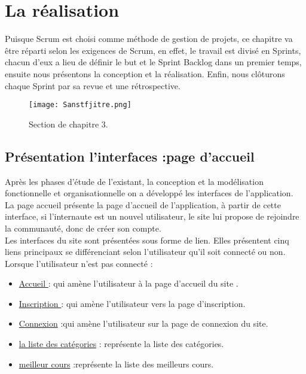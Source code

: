 \chapter{La réalisation }
\label{sec:conception}

\begin{fquote}Puisque Scrum est choisi comme méthode de gestion de projets, ce chapitre va être réparti selon
	les exigences de Scrum, en effet, le travail est divisé en Sprints, chacun d’eux a lieu de définir le but
	et le Sprint Backlog dans un premier temps, ensuite nous présentons la conception et la réalisation.
	Enfin, nous clôturons chaque Sprint par sa revue et une rétrospective.
 \end{fquote}
\begin{figure}[ht]
	\centering
	\texttt{[image: Sanstfjitre.png]}
	\caption{Section de chapitre 3.}
	\label{fig:Section de chapitre 3}
\end{figure}
\FloatBarrier
\clearpage
\section{Présentation l'interfaces :page d'accueil}
Après les phases d’étude de l’existant, la conception et la modélisation fonctionnelle et
organisationnelle on a développé les interfaces de l’application.\\
La page accueil présente la page d’accueil de l’application, à partir de cette interface, si
l’internaute est un nouvel utilisateur, le site lui propose de rejoindre la communauté, donc de
créer son compte.\\
Les interfaces du site sont présentées sous forme de lien. Elles présentent cinq liens
principaux se différenciant selon l’utilisateur qu’il soit connecté ou non. \\
{\color{cyan} Lorsque l’utilisateur n’est pas connecté  :
}

\begin{itemize}
	\item \underline{Accueil }  : qui amène l’utilisateur à la page d’accueil du site .
	\item \underline{Inscription }  : qui amène l’utilisateur vers la page d’inscription.
	\item \underline{Connexion}  :qui amène l’utilisateur sur la page de connexion du site.
	
	\item \underline{la liste des catégories}  : représente la liste des catégories.
	\item \underline{meilleur cours}  :représente la liste des meilleurs cours.
\end{itemize}

